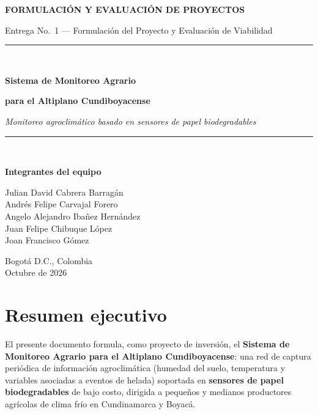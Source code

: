 \documentclass[11pt,a4paper]{article}
\begin{document}
\begin{titlepage}
\centering
\vspace*{1.5cm}
{\Large\bfseries FORMULACIÓN Y EVALUACIÓN DE PROYECTOS\par}
\vspace{0.6cm}
{\large Entrega No.\ 1 --- Formulación del Proyecto y Evaluación de Viabilidad\par}
\vspace{2.2cm}

\rule{0.8\textwidth}{0.6pt}\\[0.5cm]
{\Huge\bfseries\color{darkgreen} Sistema de Monitoreo Agrario\par}
{\Huge\bfseries\color{darkgreen} para el Altiplano Cundiboyacense\par}
\vspace{0.3cm}
{\large\itshape Monitoreo agroclimático basado en sensores de papel biodegradables\par}
\rule{0.8\textwidth}{0.6pt}\\[1.5cm]

{\large\bfseries Integrantes del equipo\par}
\vspace{0.4cm}
{\large
Julian David Cabrera Barragán\\
Andrés Felipe Carvajal Forero\\
Angelo Alejandro Ibañez Hernández\\
Juan Felipe Chibuque López\\
Joan Francisco Gómez\par
}

\vfill
{\large Bogotá D.C., Colombia\\ Octubre de 2026\par}
\end{titlepage}

\tableofcontents
\clearpage

\section{Resumen ejecutivo}

El presente documento formula, como proyecto de inversión, el \textbf{Sistema de Monitoreo Agrario para el Altiplano Cundiboyacense}: una red de captura periódica de información agroclimática (humedad del suelo, temperatura y variables asociadas a eventos de helada) soportada en \textbf{sensores de papel biodegradables} de bajo costo, dirigida a pequeños y medianos productores agrícolas de clima frío en Cundinamarca y Boyacá.
\end{document}
